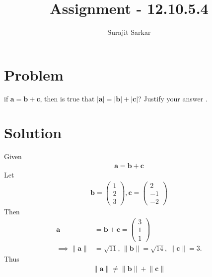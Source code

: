 \documentclass[journal,12pt,twocolumn]{IEEEtran}
\title{\mytitle}
\title{
Assignment - 12.10.5.4
}
\author{Surajit Sarkar}
\newcommand{\myvec}[1]{\ensuremath{\begin{pmatrix}#1\end{pmatrix}}}
\providecommand{\norm}[1]{\lVert#1\rVert}
\let\vec\mathbf
\begin{document}
\maketitle
\tableofcontents
\bigskip
\section{\textbf{Problem}}
if $\vec{a}=\vec{b}+\vec{c}$, then is true that $|\vec{a}|=|\vec{b}|+|\vec{c}|$?
Justify your answer .
\section{\textbf{Solution}}
Given
\begin{align}
    \vec{a}=\vec{b}+\vec{c}
\end{align}
\fi
Let
\begin{align}
    \vec{b}=\myvec{1\\2\\3},\vec{c}=\myvec{2\\-1\\-2}
\end{align}
Then
\begin{align}
	\vec{a}&=\vec{b}+\vec{c}
    =\myvec{3\\1\\1}
    \\
	\implies
    \norm{\vec{a}}
    &=\sqrt{11},\,
    \norm{\vec{b}}    =\sqrt{14},\,
    \norm{\vec{c}}
    =3.
\end{align}
Thus
\begin{align}
	\norm{\vec{a}}\ne\norm{\vec{b}}+\norm{\vec{c}}
\end{align}
\end{document}
